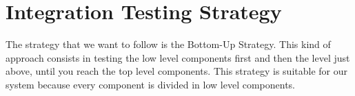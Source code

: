 \documentclass[../../../../testPlan.tex]{subfiles}
\begin{document}
	\section{Integration Testing Strategy}
		The strategy that we want to follow is the Bottom-Up Strategy. This kind of approach consists in testing the low level components first and then the level just above, until you reach the top level components.
		This strategy is suitable for our system because every component is divided in low level components.
		
\end{document}
